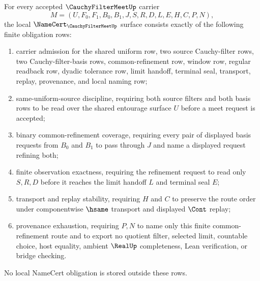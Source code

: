 
\begin{theorem}
\label{thm:cauchy-filter-meet-namecert-obligations}
For every accepted $\CauchyFilterMeetUp$ carrier
$$
M=(U,F_0,F_1,B_0,B_1,J,S,R,D,L,E,H,C,P,N),
$$
the local $\NameCert_{\CauchyFilterMeetUp}$ surface consists exactly of the following finite obligation rows:
\begin{enumerate}
\item carrier admission for the shared uniform row, two source Cauchy-filter rows, two Cauchy-filter-basis rows, common-refinement row, window row, regular readback row, dyadic tolerance row, limit handoff, terminal seal, transport, replay, provenance, and local naming row;
\item same-uniform-source discipline, requiring both source filters and both basis rows to be read over the shared entourage surface $U$ before a meet request is accepted;
\item binary common-refinement coverage, requiring every pair of displayed basis requests from $B_0$ and $B_1$ to pass through $J$ and name a displayed request refining both;
\item finite observation exactness, requiring the refinement request to read only $S,R,D$ before it reaches the limit handoff $L$ and terminal seal $E$;
\item transport and replay stability, requiring $H$ and $C$ to preserve the route order under componentwise $\hsame$ transport and displayed $\Cont$ replay;
\item provenance exhaustion, requiring $P,N$ to name only this finite common-refinement route and to export no quotient filter, selected limit, countable choice, host equality, ambient $\RealUp$ completeness, Lean verification, or bridge checking.
\end{enumerate}
No local NameCert obligation is stored outside these rows.
\end{theorem}

